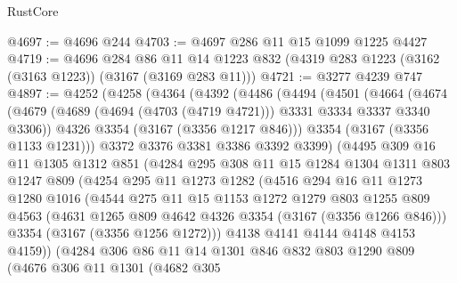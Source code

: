 \begin{lexlean}{RustCore}
\begin{coremodule}
@4697 := @4696 @244
@4703 := @4697 @286 @11 @15 @1099 @1225 @4427
@4719 := @4696
    @284
    @86
    @11
    @14
    @1223
    @832
    (@4319 @283 @1223 (@3162 (@3163 @1223)) (@3167 (@3169 @283 @11)))
@4721 := @3277 @4239 @747
@4897 := @4252
    (@4258
      (@4364
        (@4392
          (@4486
            (@4494
              (@4501
                (@4664
                  (@4674
                    (@4679 (@4689 (@4694 (@4703 (@4719 @4721))) @3331 @3334 @3337 @3340 @3306))
                    @4326
                    @3354
                    (@3167 (@3356 @1217 @846)))
                  @3354
                  (@3167 (@3356 @1133 @1231)))
                @3372
                @3376
                @3381
                @3386
                @3392
                @3399)
              (@4495
                @309
                @16
                @11
                @1305
                @1312
                @851
                (@4284
                  @295
                  @308
                  @11
                  @15
                  @1284
                  @1304
                  @1311
                  @803
                  @1247
                  @809
                  (@4254
                    @295
                    @11
                    @1273
                    @1282
                    (@4516
                      @294
                      @16
                      @11
                      @1273
                      @1280
                      @1016
                      (@4544
                        @275
                        @11
                        @15
                        @1153
                        @1272
                        @1279
                        @803
                        @1255
                        @809
                        @4563
                        (@4631 @1265 @809 @4642 @4326 @3354 (@3167 (@3356 @1266 @846)))
                        @3354
                        (@3167 (@3356 @1256 @1272)))
                      @4138
                      @4141
                      @4144
                      @4148
                      @4153
                      @4159))
                  (@4284
                    @306
                    @86
                    @11
                    @14
                    @1301
                    @846
                    @832
                    @803
                    @1290
                    @809
                    (@4676
                      @306
                      @11
                      @1301
                      (@4682
                        @305

\end{coremodule}
\end{lexlean}
